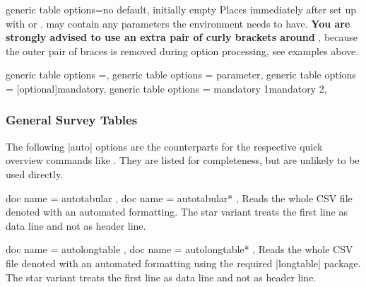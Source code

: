 \documentclass[a4paper,11pt]{ltxdoc}
\begin{document}
\begin{docCsvKey}[][doc new=2021-09-09]{generic table options}{=}{no default, initially empty}
  Places  immediately after  set up with
   or .
   may contain any parameters the environment  needs to have.
  \textbf{\color{red!50!black}You are strongly advised to use an extra pair of
  curly brackets  around }, because the outer pair of braces is
  removed during option processing, see examples above.
\begin{dispListing}
  generic table options =,
  generic table options = {{parameter}},
  generic table options = {[optional]{mandatory}},
  generic table options = {{mandatory 1}{mandatory 2}},
\end{dispListing}

\end{docCsvKey}


\clearpage
\subsubsection{General Survey Tables}\label{subsubsec:table_survey}

The following |auto| options are the counterparts for the respective quick
overview commands like . They are listed for
completeness, but are unlikely to be used directly.

\begin{docCsvKeys}[
    doc parameter   = {=\meta{file name}},
    doc description = no default,
  ]
  {
    { doc name = autotabular  },
    { doc name = autotabular* },
  }
  Reads the whole CSV file denoted  with an automated formatting.
  The star variant treats the first line as data line and not as header line.
\end{docCsvKeys}


\begin{docCsvKeys}[
    doc parameter   = {=\meta{file name}},
    doc description = no default,
  ]
  {
    { doc name = autolongtable  },
    { doc name = autolongtable* },
  }
  Reads the whole CSV file denoted  with an automated formatting
  using the required |longtable| package.
  The star variant treats the first line as data line and not as header line.
\end{docCsvKeys}
\end{document}
